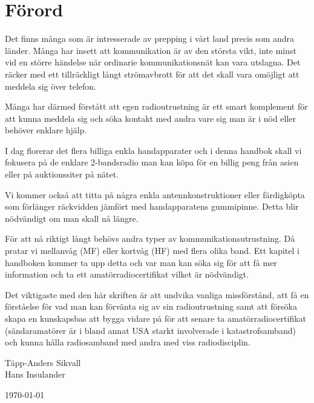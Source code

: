 \begingroup
\setlength{\parskip}{1em plus 0.5em minus 0.2em}
\setlength{\parindent}{0pt}
\section*{Förord}

Det finns många som är intresserade av prepping i vårt land precis som andra länder. Många har insett att kommunikation är av den största vikt, inte minst vid en större händelse när ordinarie kommunikationsnät kan vara utslagna. Det räcker med ett tillräckligt långt strömavbrott för att det skall vara omöjligt att meddela sig över telefon.

Många har därmed förstått att egen radioutrustning är ett smart komplement för att kunna meddela sig och söka kontakt med andra vare sig man är i nöd eller behöver enklare hjälp.

I dag florerar det flera billiga enkla handapparater och i denna handbok skall vi fokusera på de enklare 2-bandsradio man kan köpa för en billig peng från asien eller på auktionssiter på nätet.

Vi kommer också att titta på några enkla antennkonstruktioner eller färdigköpta som förlänger räckvidden jämfört med handapparatens gummipinne. Detta blir nödvändigt om man skall nå längre.

För att nå riktigt långt behövs andra typer av kommunikationsutrustning. Då pratar vi mellanvåg (MF) eller kortvåg (HF) med flera olika band. Ett kapitel i handboken kommer ta upp detta och var man kan söka sig för att få mer information och ta ett amatörradiocertifikat vilket är nödvändigt.

Det viktigaste med den här skriften är att undvika vanliga missförstånd, att få en förståelse för vad man kan förvänta sig av sin radioutrustning samt att försöka skapa en kunskapsbas att bygga vidare på för att senare ta amatörradiocertifikat (sändaramatörer är i bland annat USA starkt involverade i katastrofsamband) och kunna hålla radiosamband med andra med viss radiodisciplin.

Täpp-Anders Sikvall\\
Hans Insulander

\today
\endgroup
\clearpage
